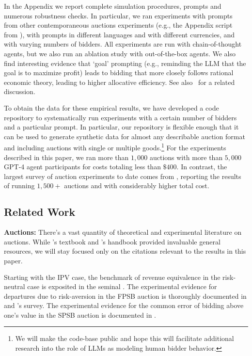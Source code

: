 \documentclass{article} %
\begin{document}
In the Appendix we report complete simulation procedures, prompts and numerous robustness checks. In particular, we ran experiments with prompts from other contemporaneous auctions experiments (e.g., the Appendix script from \citet{li2017obviously}), with prompts in different languages and with different currencies, and with varying numbers of bidders. All experiments are run with chain-of-thought agents, but we also run an ablation study with out-of-the-box agents. We also find interesting evidence that `goal' prompting (e.g., reminding the LLM that the goal is to maximize profit) leads to bidding that more closely follows rational economic theory, leading to higher allocative efficiency. See also~\citet{manning2024automated} for a related discussion. 

To obtain the data for these empirical results, we have developed a code repository to systematically run experiments 
with a certain number of bidders and a particular prompt. 
In particular, our repository is flexible enough that it can be used to generate synthetic data for almost any describable  auction format and including auctions with single or multiple goods.\footnote{We will make the code-base public  and hope this will facilitate additional research into the role of LLMs as modeling human bidder behavior.}
%
For the experiments described in this paper, we ran more than $1,000$ auctions with more than $5,000$ GPT-4 agent participants for costs totaling less than $\$400$. 
In contrast, the largest survey of auction experiments to date comes from \citet{cox1988theory}, reporting the results of
running $1,500+$ auctions and with considerably higher total cost.


\subsection{Related Work}




\textbf{Auctions:}
There's a vast quantity of theoretical and experimental literature on auctions. 
While \citet{krishna2009auction}'s textbook and \citet{kagel2020handbook}'s handbook provided invaluable general resources, we will stay focused only on the citations relevant to the results in this paper.

Starting with the IPV case, the benchmark of revenue equivalence in the risk-neutral case is exposited in the seminal 
\citet{myerson1981optimal}. 
The experimental evidence for departures due to risk-aversion in the FPSB auction is thoroughly documented in \citet{coppinger1980incentives} and \citet{cox1988theory}'s survey. 
The experimental evidence for the common error of bidding above one's value in the SPSB auction is documented in \citet{kagel1993independent}.
\end{document}
